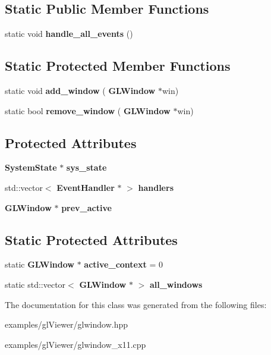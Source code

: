 \subsection*{Static Public Member Functions}
\begin{DoxyCompactItemize}
\item 
\mbox{\label{classglwindow_1_1_g_l_window_a00458901c7cca772aba1e37c7ae11da5}} 
static void {\bfseries handle\+\_\+all\+\_\+events} ()
\end{DoxyCompactItemize}
\subsection*{Static Protected Member Functions}
\begin{DoxyCompactItemize}
\item 
\mbox{\label{classglwindow_1_1_g_l_window_a6ec4437b302fad937613bbc7305b54af}} 
static void {\bfseries add\+\_\+window} (\textbf{ G\+L\+Window} $\ast$win)
\item 
\mbox{\label{classglwindow_1_1_g_l_window_a20ba7d81fc374904b55ec40e3fb19a52}} 
static bool {\bfseries remove\+\_\+window} (\textbf{ G\+L\+Window} $\ast$win)
\end{DoxyCompactItemize}
\subsection*{Protected Attributes}
\begin{DoxyCompactItemize}
\item 
\mbox{\label{classglwindow_1_1_g_l_window_a362305bae97dad5418748841d7691694}} 
\textbf{ System\+State} $\ast$ {\bfseries sys\+\_\+state}
\item 
\mbox{\label{classglwindow_1_1_g_l_window_a63eb370b84f35a788b4831e7e8ebb883}} 
std\+::vector$<$ \textbf{ Event\+Handler} $\ast$ $>$ {\bfseries handlers}
\item 
\mbox{\label{classglwindow_1_1_g_l_window_a1b26b56139bda79015c4acd5082af29b}} 
\textbf{ G\+L\+Window} $\ast$ {\bfseries prev\+\_\+active}
\end{DoxyCompactItemize}
\subsection*{Static Protected Attributes}
\begin{DoxyCompactItemize}
\item 
\mbox{\label{classglwindow_1_1_g_l_window_ae9a8057a689a57a27f923bc745de4bf8}} 
static \textbf{ G\+L\+Window} $\ast$ {\bfseries active\+\_\+context} = 0
\item 
\mbox{\label{classglwindow_1_1_g_l_window_a53cc9ed919e7251c9a33bf5f9197375c}} 
static std\+::vector$<$ \textbf{ G\+L\+Window} $\ast$ $>$ {\bfseries all\+\_\+windows}
\end{DoxyCompactItemize}


The documentation for this class was generated from the following files\+:\begin{DoxyCompactItemize}
\item 
examples/gl\+Viewer/glwindow.\+hpp\item 
examples/gl\+Viewer/glwindow\+\_\+x11.\+cpp\end{DoxyCompactItemize}
